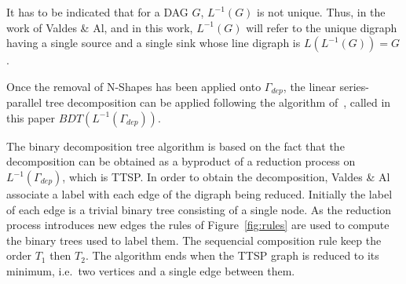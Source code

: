 It has to be indicated that for a DAG $G$, $L^{-1}(G)$ is not unique. Thus, in the work of Valdes \& Al, and in this work, $L^{-1}(G)$ will refer to the unique digraph having a single source and a single sink whose line digraph is $L(L^{-1}(G))=G$.

Once the removal of N-Shapes has been applied onto $\Gamma_{dep}$, the linear series-parallel tree decomposition can be applied following the algorithm of~\cite{Valdes:1979:RSP:800135.804393}, called in this paper $BDT(L^{-1}(\Gamma_{dep}))$.

The binary decomposition tree algorithm is based on the fact that the decomposition can be obtained as a byproduct of a reduction process on $L^{-1}(\Gamma_{dep})$, which is TTSP. In order to obtain the decomposition, Valdes \& Al associate a label with each edge of the digraph being reduced. Initially the label of each edge is a trivial binary tree consisting of a single node. As the reduction process introduces new edges the rules of Figure~\ref{fig:rules} are used to compute the binary trees used to label them. The sequencial composition rule keep the order $T_1$ then $T_2$. The algorithm ends when the TTSP graph is reduced to its minimum, i.e.\ two vertices and a single edge between them.

